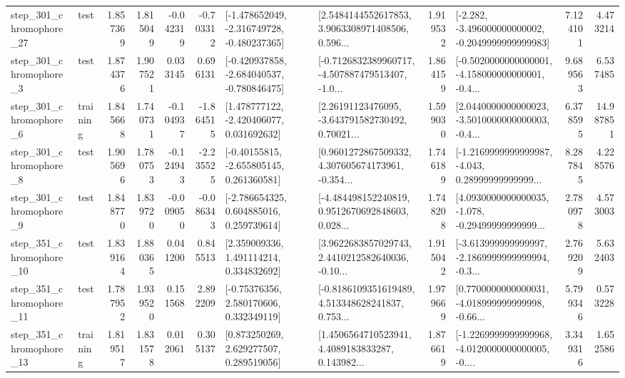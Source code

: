 \begin{tabular}{llrrrrllrlrr}
  step\_301\_chromophore\_27 &      test &      1.857369 &    1.815049 &     -0.042319 & -0.703312 &  [-1.478652049, -2.316749728, -0.480237365] &  [2.5484144552617853, 3.9063308971408506, 0.596... &       1.919532 &  [-2.282, -3.496000000000002, -0.2049999999999983] &            7.124101 &          4.473214 \\
   step\_301\_chromophore\_3 &      test &      1.874376 &    1.907521 &      0.033145 &  0.696131 &  [-0.420937858, -2.684040537, -0.780846475] &  [-0.7126832389960717, -4.507887479513407, -1.0... &       1.864159 &  [-0.5020000000000001, -4.158000000000001, -0.4... &            9.689563 &          6.537485 \\
   step\_301\_chromophore\_6 &  training &      1.845668 &    1.740731 &     -0.104937 & -1.864515 &    [1.478777122, -2.420406077, 0.031692632] &  [2.26191123476095, -3.643791582730492, 0.70021... &       1.599030 &  [2.0440000000000023, -3.5010000000000003, -0.4... &            6.378595 &         14.987851 \\
   step\_301\_chromophore\_8 &      test &      1.905696 &    1.780753 &     -0.124943 & -2.235525 &    [-0.40155815, -2.655805145, 0.261360581] &  [0.9601272867509332, 4.307605674173961, -0.354... &       1.746189 &  [-1.2169999999999987, -4.043, 0.28999999999999... &            8.287845 &          4.228576 \\
   step\_301\_chromophore\_9 &      test &      1.848770 &    1.839720 &     -0.009050 & -0.086343 &    [-2.786654325, 0.604885016, 0.259739614] &  [-4.484498152240819, 0.9512670692848603, 0.028... &       1.748208 &  [4.0930000000000035, -1.078, -0.29499999999999... &            2.780978 &          4.573003 \\
  step\_351\_chromophore\_10 &      test &      1.839164 &    1.880365 &      0.041200 &  0.845513 &     [2.359009336, 1.491114214, 0.334832692] &  [3.9622683857029743, 2.4410212582640036, -0.10... &       1.915042 &  [-3.613999999999997, -2.1869999999999994, -0.3... &            2.769209 &          5.632403 \\
  step\_351\_chromophore\_11 &      test &      1.787952 &    1.939520 &      0.151568 &  2.892209 &     [-0.75376356, 2.580170606, 0.332349119] &  [-0.8186109351619489, 4.513348628241837, 0.753... &       1.979669 &  [0.7700000000000031, -4.018999999999998, -0.66... &            5.799346 &          0.573228 \\
  step\_351\_chromophore\_13 &  training &      1.819517 &    1.831578 &      0.012061 &  0.305137 &     [0.873250269, 2.629277507, 0.289519056] &  [1.4506564710523941, 4.4089183833287, 0.143982... &       1.876619 &  [-1.2269999999999968, -4.0120000000000005, -0.... &            3.349316 &          1.652586 \\

\end{tabular}
